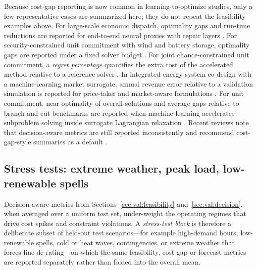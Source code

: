 Because cost-gap reporting is now common in learning-to-optimize
studies, only a few representative cases are summarized here; they
do not repeat the feasibility examples above. For large-scale economic
dispatch, optimality gaps and run-time reductions are reported for
end-to-end neural proxies with repair layers \cite{Chen20244723}. For
security-constrained unit commitment with wind and battery storage,
optimality gaps are reported under a fixed solver budget
\cite{Wu2022231}. For joint chance-constrained unit commitment, a
\emph{regret percentage} quantifies the extra cost of the accelerated
method relative to a reference solver \cite{Liang20246508}. In
integrated energy system co-design with a machine-learning market
surrogate, annual revenue error relative to a validation simulation
is reported for price-taker and market-aware formulations
\cite{Jalving2023}. For unit commitment, near-optimality of overall
solutions and average gaps relative to branch-and-cut benchmarks are
reported when machine learning accelerates subproblem solving inside
surrogate Lagrangian relaxation \cite{Wu2024391}. Recent reviews note
that decision-aware metrics are still reported inconsistently and
recommend cost-gap-style summaries as a default
\cite{Ruan2021221,Khaloie2025,Lim2025}.

\subsection{Stress tests: extreme weather, peak load, low-renewable spells}
\label{sec:val:stress}

Decision-aware metrics from Sections~\ref{sec:val:feasibility}
and~\ref{sec:val:decision}, when averaged over a uniform test set,
under-weight the operating regimes that drive cost spikes and
constraint violations. A \emph{stress-test block} is therefore a
deliberate subset of held-out test scenarios---for example
high-demand hours, low-renewable spells, cold or heat waves,
contingencies, or extreme weather that forces line de-rating---on
which the same feasibility, cost-gap or forecast metrics are reported
separately rather than folded into the overall mean.

